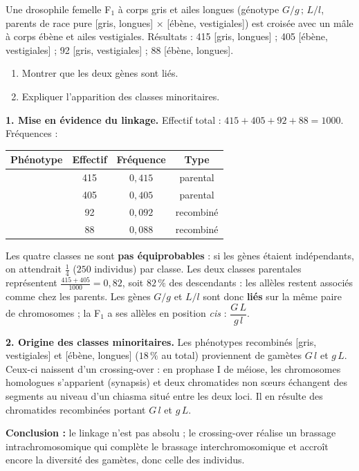 \documentclass[11pt]{article}
\newcommand{\cle}[1]{{\popxbold\color{popdark}#1}}
\begin{document}
\begin{exoresolu}
Une drosophile femelle F$_1$ à corps gris et ailes longues (génotype $G/g\,;\,L/l$, parents de race pure [gris, longues] $\times$ [ébène, vestigiales]) est croisée avec un mâle à corps ébène et ailes vestigiales. Résultats : 415 [gris, longues] ; 405 [ébène, vestigiales] ; 92 [gris, vestigiales] ; 88 [ébène, longues].
\begin{enumerate}
\item Montrer que les deux gènes sont liés.
\item Expliquer l'apparition des classes minoritaires.
\end{enumerate}
\tcblower
\textbf{1. Mise en évidence du linkage.} Effectif total : $415+405+92+88 = 1000$. Fréquences :
\begin{center}
\begin{tabular}{|l|c|c|c|}
\hline
\rowcolor{popblueL} Phénotype & Effectif & Fréquence & Type \\
\hline
[gris, longues] & 415 & $0{,}415$ & parental \\
\hline
[ébène, vestigiales] & 405 & $0{,}405$ & parental \\
\hline
[gris, vestigiales] & 92 & $0{,}092$ & recombiné \\
\hline
[ébène, longues] & 88 & $0{,}088$ & recombiné \\
\hline
\end{tabular}
\end{center}
Les quatre classes ne sont \textbf{pas équiprobables} : si les gènes étaient indépendants, on attendrait $\frac{1}{4}$ ($250$ individus) par classe. Les deux classes parentales représentent $\frac{415+405}{1000} = 0{,}82$, soit $82\,\%$ des descendants : les allèles restent associés comme chez les parents. Les gènes $G/g$ et $L/l$ sont donc \textbf{liés} sur la même paire de chromosomes ; la F$_1$ a ses allèles en position \emph{cis} : $\dfrac{G\,L}{g\,l}$.

\textbf{2. Origine des classes minoritaires.} Les phénotypes recombinés [gris, vestigiales] et [ébène, longues] ($18\,\%$ au total) proviennent de gamètes $G\,l$ et $g\,L$. Ceux-ci naissent d'un \cle{crossing-over} : en prophase I de méiose, les chromosomes homologues s'apparient (synapsis) et deux chromatides non sœurs échangent des segments au niveau d'un chiasma situé entre les deux loci. Il en résulte des chromatides recombinées portant $G\,l$ et $g\,L$.

\textbf{Conclusion :} le linkage n'est pas absolu ; le crossing-over réalise un \cle{brassage intrachromosomique} qui complète le brassage interchromosomique et accroît encore la diversité des gamètes, donc celle des individus.
\end{exoresolu}
\end{document}
